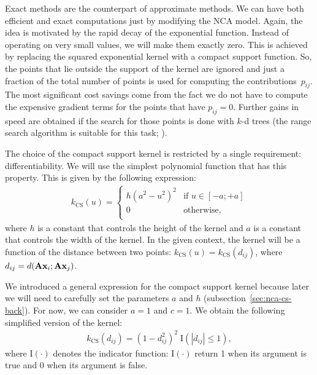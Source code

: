 	Exact methods are the counterpart of approximate methods. We can have both efficient and exact computations just by modifying the NCA model. Again, the idea is motivated by the rapid decay of the
	exponential function. Instead of operating on very small values, we will make them exactly zero. This is achieved by replacing the squared exponential kernel with a compact support function. So, the points that lie outside the support of the kernel are ignored and just a fraction of the total number of points is used for computing the contributions~$p_{ij}$. The most significant cost savings come from the fact we do not have to compute the expensive gradient terms for the points that have $p_{ij}=0$. Further gains in speed are obtained if the search for those points is done with $k$-d trees (the range search algorithm is suitable for this task; \citealp{moore1991}).
	
	The choice of the compact support kernel is restricted by a single requirement: differentiability. We will use the simplest polynomial function that has this property. This is given by the
	following expression:
	\begin{align}
		k_{\text{CS}}(u)=\begin{cases}
			h(a^2-u^2)^2& \mbox{if } u \in [-a;+a]\\
			0& \mbox{otherwise},\\
		\end{cases}
		\label{eq:cs-1}
	\end{align}
	where $h$ is a constant that controls the height of the kernel and $a$ is a constant that controls the width of the kernel. In the given context, the kernel will be a function of the distance between two points: $k_{\text{CS}}(u)=k_{\text{CS}}(d_{ij})$, where $d_{ij} = d(\mathbf{A}\mathbf{x}_i;\mathbf{A}\mathbf{x}_j)$. 
	
	We introduced a general expression for the compact support kernel because later we will need to carefully set the parameters $a$ and $h$ (subsection~\ref{sec:nca-cs-back}). For now, we can consider $a=1$ and $c=1$. We obtain the following simplified version of the kernel:
	\begin{align}
		k_{\text{CS}}(d_{ij})= (1-d_{ij}^2)^2\;\mathrm{I}(\left|d_{ij}\right|\le1),
	\end{align}
	where $\mathrm{I}(\cdot)$ denotes the indicator function: $\mathrm{I}(\cdot)$ return 1 when its argument is
	true and 0 when its argument is false.
	
